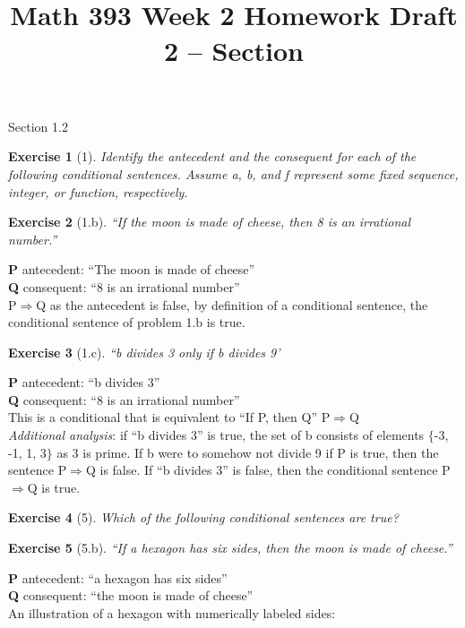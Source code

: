 \documentclass[11pt]{article}
\title{\vspace{-50pt}
\Huge \name
\\\vspace{20pt}
\normalsize Math 393 Week 2 Homework Draft 2 -- Section \hw}
\author{}
\date{}
\theoremstyle{quest}
\newtheorem*{exercise}{Exercise}
\begin{document}
\maketitle
\doublespace
Section 1.2
\begin{exercise}[1]
  Identify the antecedent and the consequent for each of the following 
  conditional sentences. Assume a, b, and f represent some fixed sequence, 
  integer, or function, respectively.
\end{exercise}
\begin{exercise}[1.b]
  ``If the moon is made of cheese, then 8 is an irrational number.''
\end{exercise}

\noindent \textbf{P} antecedent: ``The moon is made of cheese'' \\
\textbf{Q} consequent: ``8 is an irrational number'' \\

\noindent P$\Rightarrow$Q as the antecedent is false, by definition of a conditional 
sentence, the conditional sentence of problem 1.b is true.

\begin{exercise}[1.c]
``b divides 3 only if b divides 9'
\end{exercise}

\noindent \textbf{P} antecedent: ``b divides 3'' \\
\textbf{Q} consequent: ``8 is an irrational number'' \\

\noindent This is a conditional that is equivalent to ``If P, then Q'' \noindent P$\Rightarrow$Q 
\\

\noindent \textit{Additional analysis}: if ``b divides 3'' is true, the set of b consists of elements $\{$-3, -1, 1, 3$\}$ as 3 is prime. If b were to somehow not divide 9 if P is true, then the sentence P$\Rightarrow$Q is false. If ``b divides 3'' is false, then the conditional sentence P$\Rightarrow$Q is true.

\newpage

\begin{exercise}[5]
Which of the following conditional sentences are true?
\end{exercise}
\begin{exercise}[5.b]
  ``If a hexagon has six sides, then the moon is made of cheese.''
\end{exercise}
\noindent \textbf{P} antecedent: ``a hexagon has six sides'' \\
\textbf{Q} consequent: ``the moon is made of cheese'' \\
\noindent An illustration of a hexagon with numerically labeled sides:
\\\vspace{1in}
\end{document}
